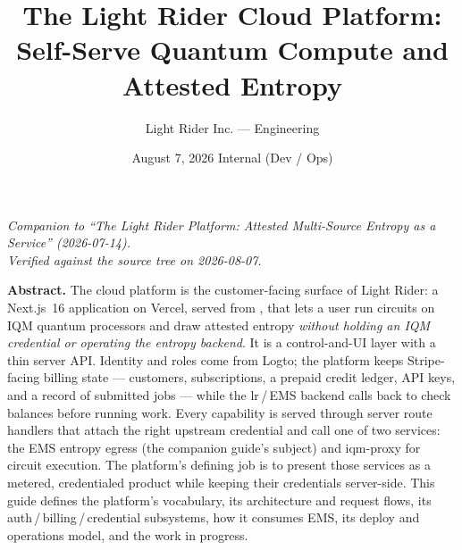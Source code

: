 \documentclass[11pt]{article}
\title{\vspace{-1.2cm}\sffamily\bfseries The Light Rider Cloud Platform:\\[2pt]
\large Self-Serve Quantum Compute and Attested Entropy}
\author{\normalsize Light Rider Inc. --- Engineering}
\date{\normalsize August 7, 2026 \quad\textbullet\quad Internal (Dev / Ops)}
\begin{document}
\maketitle
\vspace{-0.7cm}
\begin{center}\small\itshape
Companion to ``The Light Rider Platform: Attested Multi-Source Entropy as a Service'' (2026-07-14).\\
Verified against the  source tree on 2026-08-07.
\end{center}

\noindent\textbf{Abstract.}\enspace
The cloud platform is the customer-facing surface of Light Rider: a Next.js~16 application on Vercel, served from
, that lets a user run circuits on IQM quantum processors and draw attested entropy
\emph{without holding an IQM credential or operating the entropy backend}. It is a control-and-UI layer with a thin
server API. Identity and roles come from Logto; the platform keeps Stripe-facing billing state --- customers,
subscriptions, a prepaid credit ledger, API keys, and a record of submitted jobs --- while the lr\,/\,EMS backend calls
back to check balances before running work. Every capability is served through server route handlers that attach the
right upstream credential and call one of two services: the EMS entropy egress (the companion guide's subject) and
iqm-proxy for circuit execution. The platform's defining job is to present those services as a metered, credentialed
product while keeping their credentials server-side. This guide defines the platform's vocabulary, its architecture and
request flows, its auth\,/\,billing\,/\,credential subsystems, how it consumes EMS, its deploy and operations model, and
the work in progress.

\medskip
\noindent{}

\medskip
{\small\tableofcontents}
\bigskip

\end{document}
